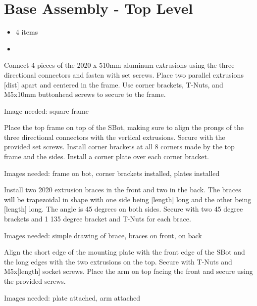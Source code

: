 \section{Base Assembly - Top Level}
\resetassemblysteps

\begin{partsbox}
\begin{minipage}[t]{\linewidth}
\vspace{0pt}
\begin{itemize}

\item
  4 items
\item
    
\end{itemize}
\end{minipage}
\end{partsbox}

Connect 4 pieces of the 2020 x 510mm aluminum extrusions using the three directional connectors and fasten with set screws. Place two parallel extrusions [dist] apart and centered in the frame. Use corner brackets, T-Nuts, and M5x10mm buttonhead screws to secure to the frame.

\begin{tipbox}
    Image needed: square frame
\end{tipbox}

Place the top frame on top of the SBot, making sure to align the prongs of the three directional connectors with the vertical extrusions. Secure with the provided set screws. Install corner brackets at all 8 corners made by the top frame and the sides. Install a corner plate over each corner bracket.

\begin{tipbox}
    Images needed: frame on bot, corner brackets installed, plates installed
\end{tipbox}

Install two 2020 extrusion braces in the front and two in the back. The braces will be trapezoidal in shape with one side being [length] long and the other being [length] long. The angle is 45 degrees on both sides. Secure with two 45 degree brackets and 1 135 degree bracket and T-Nuts for each brace.

\begin{tipbox}
    Images needed: simple drawing of brace, braces on front, on back
\end{tipbox}

Align the short edge of the mounting plate with the front edge of the SBot and the long edges with the two extrusions on the top. Secure with T-Nuts and M5x[length] socket screws. Place the arm on top facing the front and secure using the provided screws.

\begin{tipbox}
    Images needed: plate attached, arm attached
\end{tipbox}

